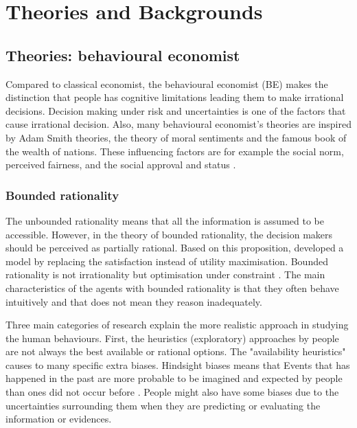 \documentclass[preprint,12pt,3p]{elsarticle}
\begin{document}
\section{Theories and Backgrounds}
\label{sec2}


\subsection{Theories: behavioural economist}

Compared to classical economist, the behavioural economist (BE) makes the distinction that people has cognitive limitations leading them to make irrational decisions. Decision making under risk and uncertainties is one of the factors that cause irrational decision. Also, many behavioural economist's theories are  inspired by Adam Smith theories, the theory of moral sentiments and the famous book of the wealth of nations. These influencing factors are for example the social norm, perceived fairness, and the social approval and status \citep{brekke2008}.


\subsubsection{Bounded rationality}

The unbounded rationality means that all the information is assumed to be accessible. However, in the theory of bounded rationality, the decision makers should be perceived as partially rational. Based on this proposition, \citep{simon1955, simon1979} developed a model by replacing the satisfaction instead of utility maximisation. Bounded rationality is not irrationality but optimisation under constraint \citep{gigerenzer2002}. The main characteristics of the agents with bounded rationality is that they often behave intuitively and that does not mean they reason inadequately. 

Three main categories of research explain the more realistic approach in studying the human behaviours. First, the heuristics (exploratory) approaches by people are not always the best available or rational options. The "availability heuristics" causes to many specific extra biases. Hindsight biases means that Events that has happened in the past are more probable to be imagined and expected by people than ones did not occur before \citep{camerer2004}. People might also have some biases due to the uncertainties surrounding them when they are predicting or evaluating the information or evidences. 
\end{document}
